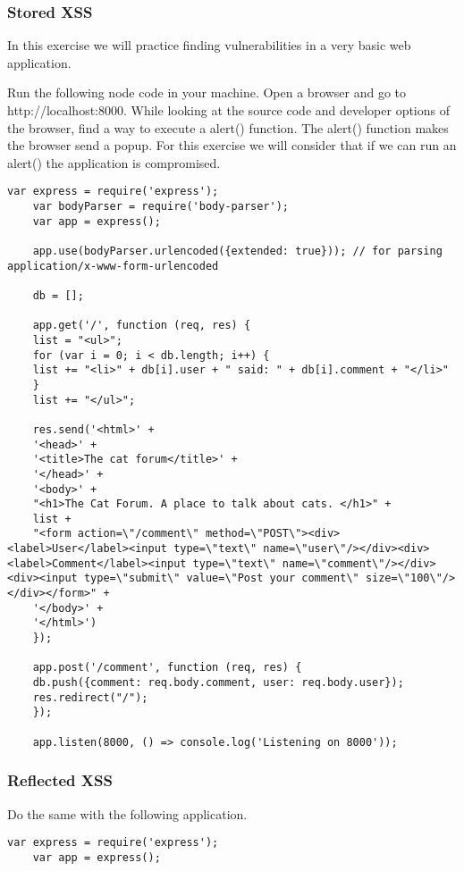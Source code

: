 
\begin{Exercise}[label={websec-xss-types}]
	\subsubsection{Stored XSS}
	In this exercise we will practice finding vulnerabilities in a very basic web application.
	
	Run the following node code in your machine. Open a browser and go to http://localhost:8000. While looking at the source code and developer options of the browser, find a way to execute a alert() function. The alert() function makes the browser send a popup. For this exercise we will consider that if we can run an alert() the application is compromised.
	
	\begin{lstlisting}[style=JavaScript]
	var express = require('express');
	var bodyParser = require('body-parser');
	var app = express();

	app.use(bodyParser.urlencoded({extended: true})); // for parsing application/x-www-form-urlencoded
	
	db = [];
	
	app.get('/', function (req, res) {
	list = "<ul>";
	for (var i = 0; i < db.length; i++) {
	list += "<li>" + db[i].user + " said: " + db[i].comment + "</li>"
	}
	list += "</ul>";
	
	res.send('<html>' +
	'<head>' +
	'<title>The cat forum</title>' +
	'</head>' +
	'<body>' +
	"<h1>The Cat Forum. A place to talk about cats. </h1>" +
	list +
	"<form action=\"/comment\" method=\"POST\"><div><label>User</label><input type=\"text\" name=\"user\"/></div><div><label>Comment</label><input type=\"text\" name=\"comment\"/></div><div><input type=\"submit\" value=\"Post your comment\" size=\"100\"/></div></form>" +
	'</body>' +
	'</html>')
	});
	
	app.post('/comment', function (req, res) {
	db.push({comment: req.body.comment, user: req.body.user});
	res.redirect("/");
	});
	
	app.listen(8000, () => console.log('Listening on 8000'));
	\end{lstlisting}
	
	\subsubsection{Reflected XSS}
		Do the same with the following application.
	\begin{lstlisting}[style=JavaScript]
	var express = require('express');
	var app = express();
	

\end{lstlisting}
\end{Exercise}

